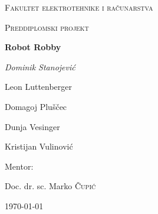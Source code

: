 \documentclass[times, utf8, numeric]{fer}
\begin{document}
\nocite{*}

\begin{titlepage}
	\centering
	{\scshape\LARGE Fakultet elektrotehnike i računarstva \par}
	\vspace{1cm}
	{\scshape\Large Preddiplomski projekt\par}
	\vspace{1.5cm}
	{\huge\bfseries Robot Robby\par}
	\vspace{2cm}
	{\Large\itshape
	Dominik Stanojević \par
	Leon Luttenberger \par
	Domagoj Pluščec \par
	Dunja Vesinger \par
	Kristijan Vulinović\par}
	\vfill
	Mentor:\par
	Doc. dr. sc. Marko \textsc{Čupić}

	\vfill

	{\large \today\par}
\end{titlepage}

\tableofcontents




\end{document}
